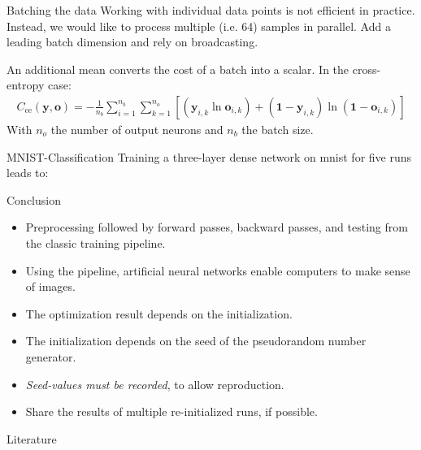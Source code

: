 \documentclass{beamer}
\begin{document}
    \begin{frame}{Batching the data}
      Working with individual data points is not efficient in practice.
      Instead, we would like to process multiple (i.e. 64) samples in parallel. 
      Add a leading batch dimension and rely on broadcasting.

      An additional mean converts the cost of a batch into a scalar.
      In the cross-entropy case:
      \begin{align}
        C_{\text{ce}}(\mathbf{y},\mathbf{o})=-\frac{1}{n_b}\sum_{i=1}^{n_b}\sum_{k=1}^{n_o}[(\mathbf{y}_{i,k}\ln\mathbf{o}_{i,k})+(\mathbf{1}-\mathbf{y}_{i,k})\ln(\mathbf{1}-\mathbf{o}_{i,k})]
      \end{align}
      With $n_o$ the number of output neurons and $n_b$ the batch size.
    \end{frame}

    \begin{frame}{MNIST-Classification}
      Training a three-layer dense network on mnist for five runs leads to:
      \begin{figure}
        
      \end{figure}
    \end{frame}

    \begin{frame}{Conclusion}
      \begin{itemize}
        \item Preprocessing followed by forward passes, backward passes, and testing from the classic training pipeline.
        \item Using the pipeline, artificial neural networks enable computers to make sense of images.
        \item The optimization result depends on the initialization.
        \item The initialization depends on the seed of the pseudorandom number generator.
        \item \textit{Seed-values must be recorded}, to allow reproduction.
        \item Share the results of multiple re-initialized runs, if possible.
      \end{itemize}
    \end{frame}

    \begin{frame}[allowframebreaks]{Literature}
      \printbibliography
    \end{frame}
\end{document}
